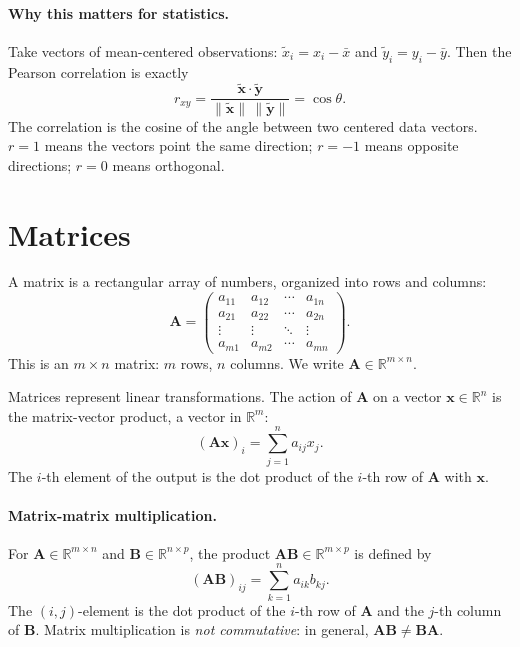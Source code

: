 \paragraph{Why this matters for statistics.} Take vectors of mean-centered observations: $\tilde{x}_i = x_i - \bar{x}$ and $\tilde{y}_i = y_i - \bar{y}$. Then the Pearson correlation is exactly
\[
  r_{xy} = \frac{\tilde{\bm{x}} \cdot \tilde{\bm{y}}}{\|\tilde{\bm{x}}\|\,\|\tilde{\bm{y}}\|} = \cos\theta.
\]
The correlation is the cosine of the angle between two centered data vectors. $r = 1$ means the vectors point the same direction; $r = -1$ means opposite directions; $r = 0$ means orthogonal.

\section{Matrices}

A matrix is a rectangular array of numbers, organized into rows and columns:
\[
  \bm{A} = \begin{pmatrix} a_{11} & a_{12} & \cdots & a_{1n} \\ a_{21} & a_{22} & \cdots & a_{2n} \\ \vdots & \vdots & \ddots & \vdots \\ a_{m1} & a_{m2} & \cdots & a_{mn} \end{pmatrix}.
\]
This is an $m \times n$ matrix: $m$ rows, $n$ columns. We write $\bm{A} \in \mathbb{R}^{m \times n}$.

Matrices represent linear transformations. The action of $\bm{A}$ on a vector $\bm{x} \in \mathbb{R}^n$ is the matrix-vector product, a vector in $\mathbb{R}^m$:
\[
  (\bm{A}\bm{x})_i = \sum_{j=1}^{n} a_{ij} x_j.
\]
The $i$-th element of the output is the dot product of the $i$-th row of $\bm{A}$ with $\bm{x}$.

\paragraph{Matrix-matrix multiplication.} For $\bm{A} \in \mathbb{R}^{m \times n}$ and $\bm{B} \in \mathbb{R}^{n \times p}$, the product $\bm{A}\bm{B} \in \mathbb{R}^{m \times p}$ is defined by
\begin{equation}
  (\bm{A}\bm{B})_{ij} = \sum_{k=1}^{n} a_{ik} b_{kj}.
  \label{eq:matrix-product}
\end{equation}
The $(i, j)$-element is the dot product of the $i$-th row of $\bm{A}$ and the $j$-th column of $\bm{B}$. Matrix multiplication is \emph{not commutative}: in general, $\bm{A}\bm{B} \neq \bm{B}\bm{A}$.

